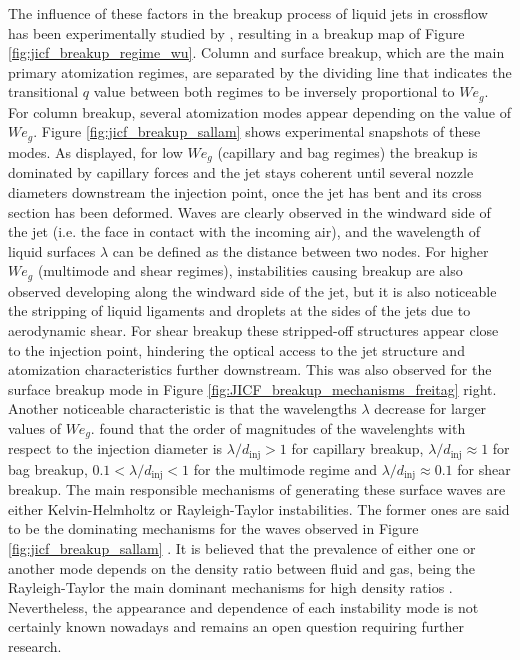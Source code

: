 The influence of these factors in the breakup process of liquid jets in crossflow has been experimentally studied by \citeColor[wu_breakup_1997], resulting in a breakup map of Figure \ref{fig:jicf_breakup_regime_wu}. Column and surface breakup, which are the main primary atomization regimes, are separated by the dividing line that indicates the transitional $q$ value between both regimes to be inversely proportional to $We_g$. For column breakup, several atomization modes appear depending on the value of $We_g$. Figure \ref{fig:jicf_breakup_sallam} shows experimental snapshots of these modes. As displayed, for low $We_g$ (capillary and bag regimes) the breakup is dominated by capillary forces and the jet stays coherent until several nozzle diameters downstream the injection point, once the jet has bent and its cross section has been deformed. Waves are clearly observed in the windward side of the jet (i.e. the face in contact with the incoming air), and the wavelength of liquid surfaces $\lambda$ can be defined as the distance between two nodes.  For higher $We_g$ (multimode and shear regimes), instabilities causing breakup are also observed developing along the windward side of the jet, but it is also noticeable the stripping of liquid ligaments and droplets at the sides of the jets due to aerodynamic shear. For shear breakup these stripped-off structures appear close to the injection point, hindering the optical access to the jet structure and atomization characteristics further downstream. This was also observed for the surface breakup mode in Figure \ref{fig:JICF_breakup_mechanisms_freitag} right. Another noticeable characteristic is that the wavelengths $\lambda$ decrease for larger values of $We_g$.  found that the order of magnitudes of the wavelenghts with respect to the injection diameter is $\lambda/d_\mathrm{inj} > 1$ for capillary breakup, $\lambda/d_\mathrm{inj} \approx 1$ for bag breakup, $0.1 < \lambda/d_\mathrm{inj} < 1$ for the multimode regime and $\lambda/d_\mathrm{inj} \approx 0.1$ for shear breakup. The main responsible mechanisms of generating these surface waves are either Kelvin-Helmholtz or Rayleigh-Taylor instabilities. The former ones are said to be the dominating mechanisms for the waves observed in Figure \ref{fig:jicf_breakup_sallam} . It is believed that the prevalence of either one or another mode depends on the density ratio between fluid and gas, being the Rayleigh-Taylor the main dominant mechanisms for high density ratios . Nevertheless, the appearance and dependence of each instability mode is not certainly known nowadays and remains an open question requiring further research.

